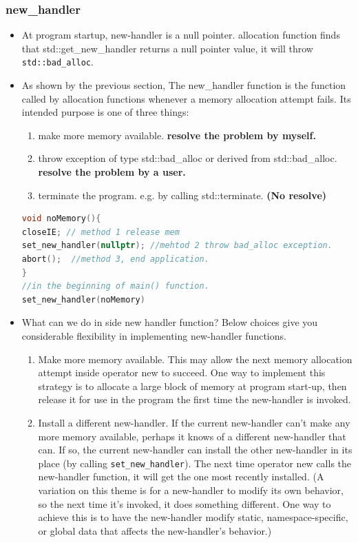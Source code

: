 \documentclass[a4paper,12pt,twoside]{book}
\begin{document}
\subsubsection{new\_handler}
\begin{itemize}

\item At program startup, new-handler is a null pointer. allocation function finds that std::get\_new\_handler returns a null pointer value, it will throw \texttt{std::bad\_alloc}.

\item  As shown by the previous section, The new\_handler function is the function called by allocation functions whenever a memory allocation attempt fails. Its intended purpose is one of three things:


\begin{enumerate}
\item make more memory available. \textbf{resolve the problem by myself.}

\item throw exception of type std::bad\_alloc or derived from std::bad\_alloc. \textbf{resolve the problem by a user.}

\item terminate the program. e.g. by calling std::terminate. \textbf{(No resolve)}
\end{enumerate}

\begin{lstlisting}[frame=single, language=c++]
void noMemory(){
closeIE; // method 1 release mem
set_new_handler(nullptr); //mehtod 2 throw bad_alloc exception.
abort();  //method 3, end application.
}
//in the beginning of main() function.
set_new_handler(noMemory)
\end{lstlisting}


\item What can we do in side new handler function? Below choices give you considerable flexibility in implementing new-handler functions.
\begin{enumerate}

\item Make more memory available. This may allow the next memory allocation attempt inside operator new to succeed. One way to implement this strategy is to allocate a large block of memory at program start-up, then release it for use in the program the first time the new-handler is invoked.

\item Install a different new-handler. If the current new-handler can't make any more memory available, perhaps it knows of a different new-handler that can. If so, the current new-handler can install the other new-handler in its place (by calling \texttt{set\_new\_handler}). The next time operator new calls the new-handler function, it will get the one most recently installed. (A variation on this theme is for a new-handler to modify its own behavior, so the next time it's invoked, it does something different. One way to achieve this is to have the new-handler modify static, namespace-specific, or global data that affects the new-handler's behavior.)


\end{enumerate}
\end{itemize}
\end{document}

